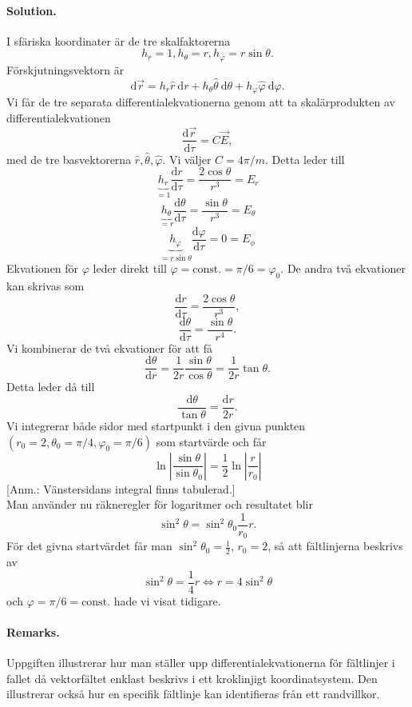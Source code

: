 \documentclass[%
oneside,                 %
final,                   %
10pt]{article}
\newenvironment{doconceexercise}{}{}
\begin{document}
\begin{doconceexercise}


\paragraph{Solution.}
I sfäriska koordinater är de tre skalfaktorerna
$$
h_r = 1, h_\theta = r, h_\varphi = r \sin \theta.
$$
Förskjutningsvektorn är
$$
\mbox{d}\vec{r} = h_r \hat{r}~\mbox{d}r + h_\theta \hat{\theta} ~\mbox{d}\theta + h_\varphi \hat{\varphi} ~ \mbox{d}\varphi.
$$
Vi får de tre separata differentialekvationerna genom att ta skalärprodukten av differentialekvationen
$$ \frac{\mbox{d}\vec{r} }{ \mbox{d}\tau} = C \vec{E},$$
med de tre basvektorerna $\hat{r}, \hat{\theta}, \hat{\varphi}$. Vi väljer $ C = 4\pi/m$. Detta leder till
$$ \underbrace{h_r}_{=1} \frac{\mbox{d}r}{\mbox{d}\tau} = \frac{2 \cos \theta}{r^3}  = E_r$$
$$  \underbrace{h_\theta}_{= r } \frac{\mbox{d}\theta}{\mbox{d}\tau} = \frac{\sin \theta }{r^3} = E_\theta$$
$$ \underbrace{h_\varphi}_{=r \sin \theta} \frac{\mbox{d} \varphi}{\mbox{d}\tau} = 0 = E_\phi$$
Ekvationen för $\varphi$ leder direkt till $\varphi = \mbox{const.} = \pi/6 = \varphi_0 $. De andra två ekvationer kan skrivas som
$$ \frac{\mbox{d}r}{\mbox{d}\tau} = \frac{2 \cos \theta}{ r^3}, $$
$$ \frac{\mbox{d}\theta}{\mbox{d}\tau} = \frac{\sin \theta}{ r^4}.$$
Vi kombinerar de två ekvationer för att få
$$ \frac{\mbox{d}\theta}{ \mbox{d} r} = \frac{1}{2r} \frac{\sin \theta}{\cos \theta} = \frac{1}{2r} \tan\theta.$$
Detta leder då till 
$$ \frac{\mbox{d}\theta}{\tan \theta} = \frac{\mbox{d}r}{2r}.$$
Vi integrerar både sidor med startpunkt i den givna punkten $(r_0 = 2, \theta_0 = \pi/4, \varphi_0=\pi/6)$ som startvärde och får
$$ \ln \left| \frac{\sin\theta}{\sin \theta_0} \right| = \frac{1}{2} \ln \left| \frac{r}{r_0} \right|$$
[Anm.: Vänstersidans integral finns tabulerad.] 
\\Man använder nu räkneregler för logaritmer och resultatet blir 
$$ \sin^2 \theta = \sin^2 \theta_0 \frac{1}{r_0} r.$$ För det givna startvärdet får man $\sin^2 \theta_0 = \frac{1}{2}$, $r_0 = 2$, så att fältlinjerna beskrivs av
$$ \sin^2 \theta = \frac{1}{4} r \Leftrightarrow r = 4 \sin^2 \theta$$ och $\varphi = \pi/6 = \mbox{const.}$ hade vi visat tidigare.



\paragraph{Remarks.}
Uppgiften illustrerar hur man ställer upp differentialekvationerna för fältlinjer i fallet då vektorfältet enklast beskrivs i ett kroklinjigt koordinatsystem. Den illustrerar också hur en specifik fältlinje kan identifieras från ett randvillkor.


\end{doconceexercise}


\end{document}
